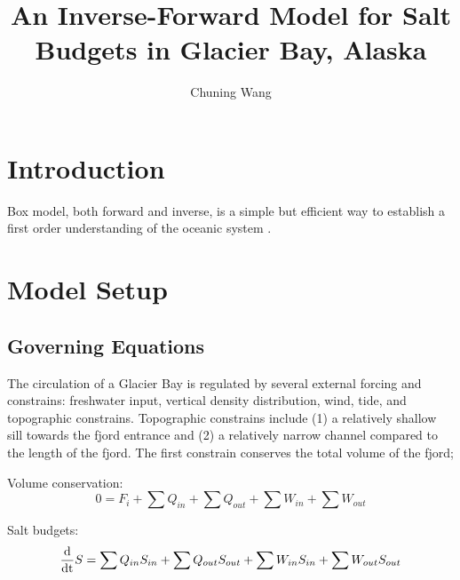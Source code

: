 \documentclass{article}
\title{An Inverse-Forward Model for Salt Budgets in Glacier Bay, Alaska}
\author{Chuning Wang}
\begin{document}
\maketitle

\section{Introduction}
Box model, both forward and inverse, is a simple but efficient way to establish a first order understanding of the oceanic system \citep{}.

\section{Model Setup}
\label{sec:method}
\subsection{Governing Equations}
The circulation of a Glacier Bay is regulated by several external forcing and constrains: freshwater input, vertical density distribution, wind, tide, and topographic constrains. Topographic constrains include (1) a relatively shallow sill towards the fjord entrance and (2) a relatively narrow channel compared to the length of the fjord. The first constrain conserves the total volume of the fjord;


Volume conservation:
\begin{equation}
  0=F_i+\sum Q_{in}+\sum Q_{out}+\sum W_{in}+\sum W_{out}
  \label{eq:vconserv}
\end{equation}

Salt budgets:
\begin{equation}
  \frac{\rm{d}}{\rm{d}t}S=\sum Q_{in}S_{in}+\sum Q_{out}S_{out}+\sum W_{in}S_{in}+\sum W_{out}S_{out}
  \label{eq:sbudget}
\end{equation}
\end{document}
